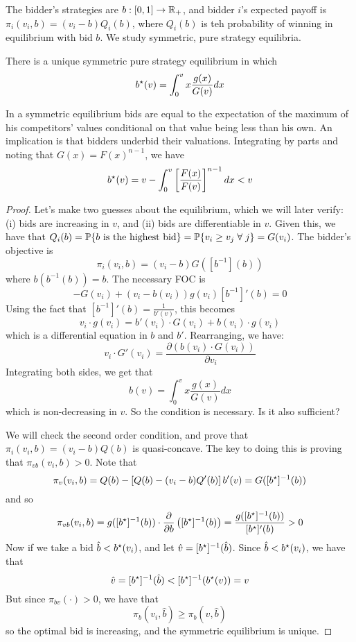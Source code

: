 \documentclass[10pt]{article}
\begin{document}
\begin{example}
	 The bidder's strategies are $b: [0,1] \to \mathbb{R}_+$, and bidder $i$'s expected payoff is $\pi_i(v_i,b) = (v_i - b) Q_i(b)$, where $Q_i(b)$ is teh probability of winning in equilibrium with bid $b$. We study symmetric, pure strategy equilibria.
	
	\begin{proposition}
		There is a unique symmetric pure strategy equilibrium in which \[b^\star(v) = \int_0^v x \frac{g(x)}{G(v)}dx\]
	\end{proposition}
	\begin{remark}
		In a symmetric equilibrium bids are equal to the expectation of the maximum of his competitors' values conditional on that value being less than his own. An implication is that bidders underbid their valuations. Integrating by parts and noting that $G(x) = F(x)^{n-1}$, we have \[b^\star (v) = v - \int_0^v \left[ \frac{F(x)}{F(v)}\right]^{n-1}dx < v\]
	\end{remark}
	\begin{proof}
		Let's make two guesses about the equilibrium, which we will later verify: (i) bids are increasing in $v$, and (ii) bids are differentiable in $v$. Given this, we have that $Q_i(b) = \prob\{b \text{ is the highest bid}\} = \prob\{v_i \ge v_j \forall j\} = G(v_i)$. The bidder's objective is \[\pi_i(v_i,b) = (v_i - b) G([b^{-1}](b))\]where $b(b^{-1}(b)) = b$. The necessary FOC is \[-G(v_i) + (v_i - b(v_i))g(v_i) [b^{-1}]'(b)=0\]Using the fact that $ [b^{-1}]'(b) = \frac{1}{b'(v)}$, this becomes \[v_i \cdot g(v_i) = b'(v_i) \cdot G(v_i) + b(v_i) \cdot g(v_i)\]which is a differential equation in $b$ and $b'$. Rearranging, we have: \[v_i \cdot G'(v_i) = \frac{\partial (b(v_i) \cdot G(v_i))}{\partial v_i}\]Integrating both sides, we get that \[b(v) = \int_0^v x \frac{g(x)}{G(v)}dx\]which is non-decreasing in $v$. So the condition is necessary. Is it also sufficient?
		
		We will check the second order condition, and prove that $\pi_i(v_i,b) = (v_i - b)Q(b)$ is quasi-concave. The key to doing this is proving that $\pi_{vb}(v_i,b) > 0$. Note that \[\pi_v(v_i,b) = Q(b) - \left[ Q(b) - (v_i-b)Q'(b)\right] b'(v) = G([b^\star]^{-1}(b))\]and so \[\pi_{vb}(v_i,b) = g([b^\star]^{-1}(b)) \cdot \frac{\partial}{\partial b}\left( [b^\star]^{-1}(b) \right) = \frac{g([b^\star]^{-1}(b))}{ [b^\star]'(b)} > 0\]Now if we take a bid $\hat{b} < b^\star(v_i)$, and let $\hat{v} = [b^\star]^{-1}(\hat{b})$. Since $\hat{b} < b^\star(v_i)$, we have that \[\hat{v} = [b^\star]^{-1}(\hat{b}) < [b^\star]^{-1}(b^\star(v)) = v\]But since $\pi_{bv}(\cdot) > 0$, we have that \[\pi_b(v_i,\hat{b}) \ge \pi_b(\hat{v},\hat{b})\]so the optimal bid is increasing, and the symmetric equilibrium is unique.
	\end{proof}
\end{example}
\end{document}
